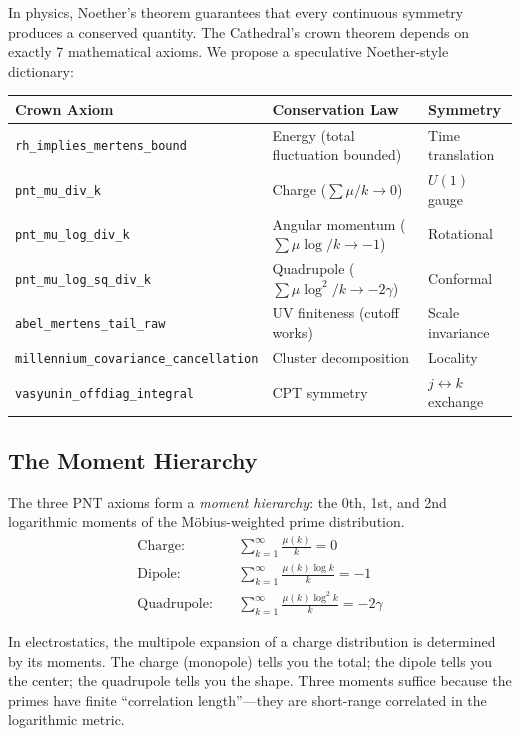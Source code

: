 \documentclass[11pt,a4paper]{article}
\theoremstyle{definition}
\newcommand{\lean}[1]{\texttt{#1}}
\begin{document}
In physics, Noether's theorem guarantees that every continuous
symmetry produces a conserved quantity. The Cathedral's crown
theorem depends on exactly 7 mathematical axioms. We propose
a speculative Noether-style dictionary:

\begin{center}
\small
\begin{tabular}{@{}lll@{}}
\toprule
\textbf{Crown Axiom} & \textbf{Conservation Law} & \textbf{Symmetry} \\
\midrule
\lean{rh\_implies\_mertens\_bound} & Energy (total fluctuation bounded)
  & Time translation \\
\lean{pnt\_mu\_div\_k} & Charge ($\sum \mu/k \to 0$)
  & $U(1)$ gauge \\
\lean{pnt\_mu\_log\_div\_k} & Angular momentum ($\sum \mu \log/k \to -1$)
  & Rotational \\
\lean{pnt\_mu\_log\_sq\_div\_k} & Quadrupole ($\sum \mu \log^2/k \to -2\gamma$)
  & Conformal \\
\lean{abel\_mertens\_tail\_raw} & UV finiteness (cutoff works)
  & Scale invariance \\
\lean{millennium\_covariance\_cancellation} & Cluster decomposition
  & Locality \\
\lean{vasyunin\_offdiag\_integral} & CPT symmetry
  & $j \leftrightarrow k$ exchange \\
\bottomrule
\end{tabular}
\end{center}

\subsection{The Moment Hierarchy}

The three PNT axioms form a \emph{moment hierarchy}: the 0th, 1st,
and 2nd logarithmic moments of the M\"obius-weighted prime distribution.
\begin{align}
  \text{Charge:}\quad & \sum_{k=1}^{\infty} \frac{\mu(k)}{k} = 0 \\
  \text{Dipole:}\quad & \sum_{k=1}^{\infty} \frac{\mu(k)\log k}{k} = -1 \\
  \text{Quadrupole:}\quad & \sum_{k=1}^{\infty} \frac{\mu(k)\log^2 k}{k} = -2\gamma
\end{align}

In electrostatics, the multipole expansion of a charge distribution
is determined by its moments. The charge (monopole) tells you the total;
the dipole tells you the center; the quadrupole tells you the shape.
Three moments suffice because the primes have finite ``correlation
length''---they are short-range correlated in the logarithmic metric.
\end{document}
